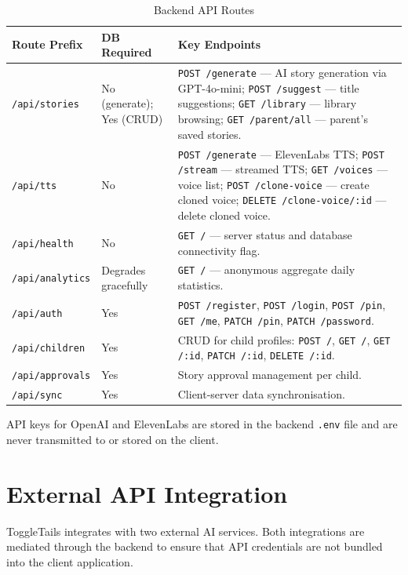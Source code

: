 \begin{table}[H]
\centering
\caption{Backend API Routes}
\label{tab:backend_routes}
\renewcommand{\arraystretch}{1.4}
\begin{tabularx}{\textwidth}{|>{\RaggedRight\arraybackslash}p{3.5cm}|>{\RaggedRight\arraybackslash}p{2cm}|>{\RaggedRight\arraybackslash}X|}
\hline
\textbf{Route Prefix} & \textbf{DB Required} & \textbf{Key Endpoints} \\
\hline
\texttt{/api/stories} & No (generate); Yes (CRUD) & \texttt{POST /generate} — AI story generation via GPT-4o-mini; \texttt{POST /suggest} — title suggestions; \texttt{GET /library} — library browsing; \texttt{GET /parent/all} — parent's saved stories. \\
\hline
\texttt{/api/tts} & No & \texttt{POST /generate} — ElevenLabs TTS; \texttt{POST /stream} — streamed TTS; \texttt{GET /voices} — voice list; \texttt{POST /clone-voice} — create cloned voice; \texttt{DELETE /clone-voice/:id} — delete cloned voice. \\
\hline
\texttt{/api/health} & No & \texttt{GET /} — server status and database connectivity flag. \\
\hline
\texttt{/api/analytics} & Degrades gracefully & \texttt{GET /} — anonymous aggregate daily statistics. \\
\hline
\texttt{/api/auth} & Yes & \texttt{POST /register}, \texttt{POST /login}, \texttt{POST /pin}, \texttt{GET /me}, \texttt{PATCH /pin}, \texttt{PATCH /password}. \\
\hline
\texttt{/api/children} & Yes & CRUD for child profiles: \texttt{POST /}, \texttt{GET /}, \texttt{GET /:id}, \texttt{PATCH /:id}, \texttt{DELETE /:id}. \\
\hline
\texttt{/api/approvals} & Yes & Story approval management per child. \\
\hline
\texttt{/api/sync} & Yes & Client-server data synchronisation. \\
\hline
\end{tabularx}
\end{table}

API keys for OpenAI and ElevenLabs are stored in the backend \texttt{.env} file and are never transmitted to or stored on the client.

\section{External API Integration}

ToggleTails integrates with two external AI services. Both integrations are mediated through the backend to ensure that API credentials are not bundled into the client application.

